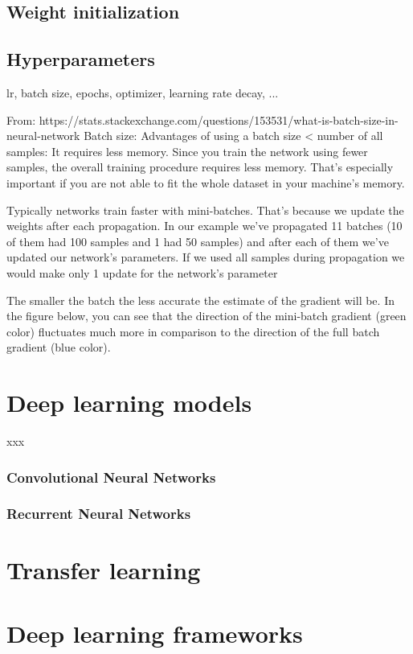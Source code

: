 \subsection{Weight initialization}
\label{weight_optimization}

\subsection{Hyperparameters}


lr, batch size, epochs, optimizer, learning rate decay, ...


From: https://stats.stackexchange.com/questions/153531/what-is-batch-size-in-neural-network
Batch size: 
Advantages of using a batch size < number of all samples:
It requires less memory. Since you train the network using fewer samples, the overall training procedure requires less memory. That's especially important if you are not able to fit the whole dataset in your machine's memory.

Typically networks train faster with mini-batches. That's because we update the weights after each propagation. In our example we've propagated 11 batches (10 of them had 100 samples and 1 had 50 samples) and after each of them we've updated our network's parameters. If we used all samples during propagation we would make only 1 update for the network's parameter


The smaller the batch the less accurate the estimate of the gradient will be. In the figure below, you can see that the direction of the mini-batch gradient (green color) fluctuates much more in comparison to the direction of the full batch gradient (blue color).


\section{Deep learning models}
xxx

\subsubsection{Convolutional Neural Networks}


\subsubsection{Recurrent Neural Networks}




\section{Transfer learning}




\section{Deep learning frameworks}